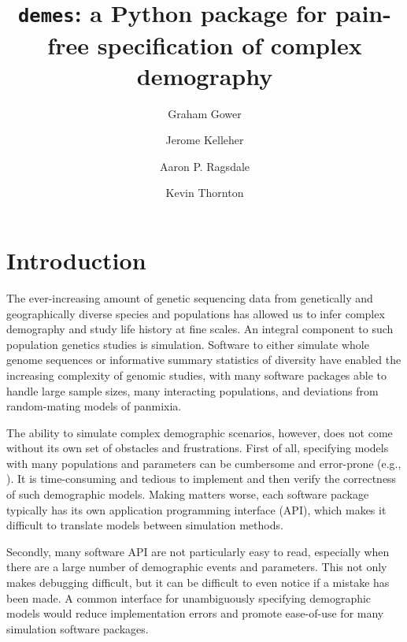 \documentclass[11pt]{article}
\newcommand{\demes}[0]{\texttt{demes}}
\begin{document}
\title{\demes: a Python package for pain-free specification of complex demography}
\author[1,*]{Graham Gower}
\author[2,*]{Jerome Kelleher}
\author[3,*]{Aaron P. Ragsdale}
\author[4,*]{Kevin Thornton}
\affil[1]{}
\affil[2]{}
\affil[3]{}
\affil[4]{}
\maketitle


\section*{Introduction}

The ever-increasing amount of genetic sequencing data from genetically and
geographically diverse species and populations has allowed us to
infer complex demography and study life history at fine scales. An integral
component to such population genetics studies is simulation. Software to
either simulate whole genome sequences
\citep{thornton2014c++,kelleher2016efficient,haller2019slim,adrion2020community}
or informative summary statistics of diversity
\citep{gutenkunst2009inferring,kamm2017efficient,jouganous2017inferring}
have enabled the increasing complexity of genomic studies, with many software
packages able to handle large sample sizes, many interacting populations, and
deviations from random-mating models of panmixia.

The ability to simulate complex demographic scenarios, however, does not come
without its own set of obstacles and frustrations. First of all, specifying models
with many populations and parameters can be cumbersome and error-prone
(e.g., \citep{ragsdale2020lessons}). It is
time-consuming and tedious to implement and then verify the correctness
of such demographic models. Making matters worse, each software package typically has
its own application programming interface (API), which makes it difficult to translate
models between simulation methods.

Secondly, many software API are not particularly easy to read, especially when there
are a large number of demographic events and parameters. This not only makes
debugging difficult, but it can be difficult to even notice if a mistake has been
made. A common interface for unambiguously specifying demographic
models would reduce implementation errors and promote ease-of-use for many simulation
software packages.
\end{document}
